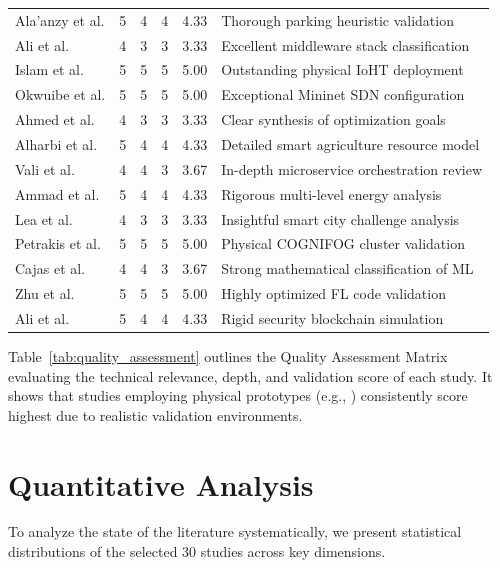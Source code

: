 \documentclass[conference]{IEEEtran}
\begin{document}
\begin{table}[t]
\begin{tabular}{lccccl}
Ala'anzy et al. \cite{b18} & 5 & 4 & 4 & 4.33 & Thorough parking heuristic validation \\
Ali et al. \cite{b19} & 4 & 3 & 3 & 3.33 & Excellent middleware stack classification \\
Islam et al. \cite{b20} & 5 & 5 & 5 & 5.00 & Outstanding physical IoHT deployment \\
Okwuibe et al. \cite{b21} & 5 & 5 & 5 & 5.00 & Exceptional Mininet SDN configuration \\
Ahmed et al. \cite{b22} & 4 & 3 & 3 & 3.33 & Clear synthesis of optimization goals \\
Alharbi et al. \cite{b23} & 5 & 4 & 4 & 4.33 & Detailed smart agriculture resource model \\
Vali et al. \cite{b24} & 4 & 4 & 3 & 3.67 & In-depth microservice orchestration review \\
Ammad et al. \cite{b25} & 5 & 4 & 4 & 4.33 & Rigorous multi-level energy analysis \\
Lea et al. \cite{b26} & 4 & 3 & 3 & 3.33 & Insightful smart city challenge analysis \\
Petrakis et al. \cite{b27} & 5 & 5 & 5 & 5.00 & Physical COGNIFOG cluster validation \\
Cajas et al. \cite{b28} & 4 & 4 & 3 & 3.67 & Strong mathematical classification of ML \\
Zhu et al. \cite{b29} & 5 & 5 & 5 & 5.00 & Highly optimized FL code validation \\
Ali et al. \cite{b30} & 5 & 4 & 4 & 4.33 & Rigid security blockchain simulation \\
\bottomrule
\end{tabular}
\end{table}

Table~\ref{tab:quality_assessment} outlines the Quality Assessment Matrix evaluating the technical relevance, depth, and validation score of each study. It shows that studies employing physical prototypes (e.g., \cite{b20, b21, b27}) consistently score highest due to realistic validation environments.

\section{Quantitative Analysis}
\label{sec:quantitative}

To analyze the state of the literature systematically, we present statistical distributions of the selected 30 studies across key dimensions.
\end{document}
